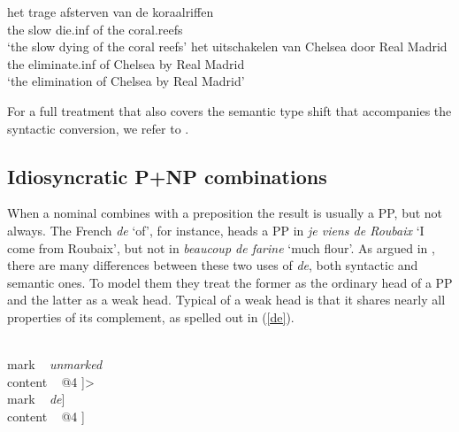 \documentclass[output=paper]{langsci/langscibook}
\begin{document}
\begin{exe} 
\ex\label{van} 
\gll   het trage afsterven van de koraalriffen   \\
       the slow die.{\sc inf} of the coral.reefs \\
\trans `the slow dying of the coral reefs' 
\ex\label{door}
\gll   het uitschakelen van Chelsea door Real Madrid      \\
       the eliminate.{\sc inf} of Chelsea by Real Madrid  \\ 
\trans `the elimination of Chelsea by Real Madrid'  
\end{exe} 

For a full treatment that also covers the semantic type shift that 
accompanies the syntactic conversion, we refer to \citet{VanEynde19}.


\subsection{Idiosyncratic P+NP combinations} 


When a nominal combines with a preposition the result is usually a PP, but 
not always. The French {\it de\/} `of', for instance, heads a PP in 
{\it je viens de Roubaix\/} `I come from Roubaix', 
but not in {\it beaucoup de farine\/} `much flour'. 
As argued in \citet{Abeilleetal04}, there are many differences 
between these two uses of {\it de\/}, both syntactic and semantic ones.
To model them they treat the former as the ordinary head of a PP and 
the latter as a weak head. Typical of a weak head is that it shares 
nearly all properties of its complement, as spelled out in (\ref{de}).

\begin{exe} 
\ex\label{de} 
\begin{avm} 
[cat [head ~ @1                              \\
      subj ~ @A                              \\
      spr ~ @B                               \\
      comps ~ <[cat [head ~ @1               \\
                     subj ~ @A               \\
                     spr ~ @B                \\
                     comps ~ < ~ >]          \\
                     mark ~ {\it unmarked\/} \\
                content ~ @4 ]>              \\ 
      mark ~ {\it de\/}]                      \\
 content ~ @4 ] 
\end{avm}
\end{exe} 
\end{document}
